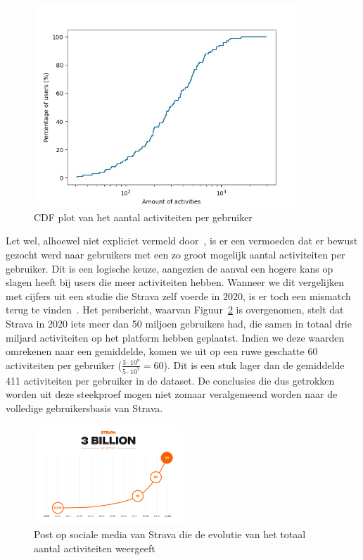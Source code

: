 \begin{figure}[h]
    \centering
    \includegraphics[width=0.9\textwidth]{fig/Afwijkingen&Analyses/CDF_amountActivities.jpg}
    \caption{\ac{CDF} plot van het aantal activiteiten per gebruiker}\label{fig:cdf_amount_activities}
\end{figure}

Let wel, alhoewel niet expliciet vermeld
door~\citeauthor{Dhondt}, is er een
vermoeden dat er bewust gezocht werd naar gebruikers met een zo groot mogelijk
aantal activiteiten per gebruiker. Dit is een logische keuze, aangezien de
aanval een hogere kans op slagen heeft bij users die meer activiteiten hebben.
Wanneer we dit vergelijken met cijfers uit een studie die Strava zelf voerde in
2020, is er toch een mismatch terug te vinden~\cite{StravaMi72:online}. Het
persbericht, waarvan Figuur~\ref{fig:3billionUsers} is overgenomen, stelt dat
Strava in 2020 iets meer dan 50 miljoen gebruikers had, die samen in totaal
drie miljard activiteiten op het platform hebben geplaatst. Indien we deze
waarden omrekenen naar een gemiddelde, komen we uit op een ruwe geschatte 60
activiteiten per gebruiker ($\frac{3 \cdot 10^9}{5 \cdot 10^7} = 60 $). Dit is
een stuk lager dan de gemiddelde 411 activiteiten per gebruiker in de dataset.
De conclusies die dus getrokken worden uit deze steekproef mogen niet zomaar
veralgemeend worden naar de volledige gebruikersbasis van Strava.
\begin{figure}[H]
    \centering
    \includegraphics[width=0.5\textwidth]{fig/Strava_3billion.png}
    \caption{Post op sociale media van Strava die de evolutie van het totaal aantal activiteiten weergeeft~\cite{StravaMi72:online}}\label{fig:3billionUsers}
\end{figure}

